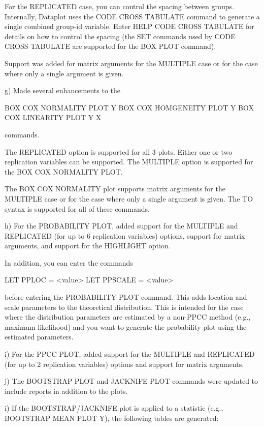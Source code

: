 {       For the REPLICATED case, you can control the spacing between
       groups.  Internally, Dataplot uses the CODE CROSS TABULATE
       command to generate a single combined group-id variable.  Enter
       HELP CODE CROSS TABULATE for details on how to control the
       spacing (the SET commands used by CODE CROSS TABULATE are
       supported for the BOX PLOT command).

       Support was added for matrix arguments for the MULTIPLE case or
       for the case where only a single argument is given.

    g) Made several enhancements to the

           BOX COX NORMALITY PLOT Y
           BOX COX HOMGENEITY PLOT Y
           BOX COX LINEARITY PLOT Y X

       commands.

       The REPLICATED option is supported for all 3 plots.  Either one or
       two replication variables can be supported.  The MULTIPLE option is
       supported for the BOX COX NORMALITY PLOT.

       The BOX COX NORMALITY plot supports matrix arguments for the MULTIPLE
       case or for the case where only a single argument is given.  The
       TO syntax is supported for all of these commands.

    h) For the PROBABILITY PLOT, added support for the MULTIPLE and
       REPLICATED (for up to 6 replication variables) options,
       support for matrix arguments, and support for the
       HIGHLIGHT option.

       In addition, you can enter the commands

           LET PPLOC   = <value>
           LET PPSCALE = <value>

       before entering the PROBABILITY PLOT command.  This adds location
       and scale parameters to the theoretical distribution.  This is
       intended for the case where the distribution parameters are
       estimated by a non-PPCC method (e.g., maximum likelihood) and
       you want to generate the probability plot using the estimated
       parameters.

    i) For the PPCC PLOT, added support for the MULTIPLE and
       REPLICATED (for up to 2 replication variables) options
       and support for matrix arguments.

    j) The BOOTSTRAP PLOT and JACKNIFE PLOT commands were updated
       to include reports in addition to the plots.

        i) If the BOOTSTRAP/JACKNIFE plot is applied to a statistic
           (e.g., BOOTSTRAP MEAN PLOT Y), the following tables are
           generated:

}

